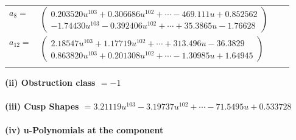 \documentclass[1p]{elsarticle_modified}
\theoremstyle{definition}
\begin{document}
\begin{tabular}{m{7pt} m{180pt} m{7pt} m{180pt} }
\flushright $a_{8}=$&$\begin{pmatrix}0.203520 u^{103}+0.306686 u^{102}+\cdots-469.111 u+0.852562\\-1.74430 u^{103}-0.392406 u^{102}+\cdots+35.3865 u-1.76628\end{pmatrix}$ \\
\flushright $a_{12}=$&$\begin{pmatrix}2.18547 u^{103}+1.17719 u^{102}+\cdots+313.496 u-36.3829\\0.863820 u^{103}+0.201308 u^{102}+\cdots-1.30985 u+1.64945\end{pmatrix}$\\&\end{tabular}
\flushleft \textbf{(ii) Obstruction class $= -1$}\\~\\
\flushleft \textbf{(iii) Cusp Shapes $= 3.21119 u^{103}-3.19737 u^{102}+\cdots-71.5495 u+0.533728$}\\~\\
\newpage\renewcommand{\arraystretch}{1}
\flushleft \textbf{(iv) u-Polynomials at the component}\newline \\
\end{document}
